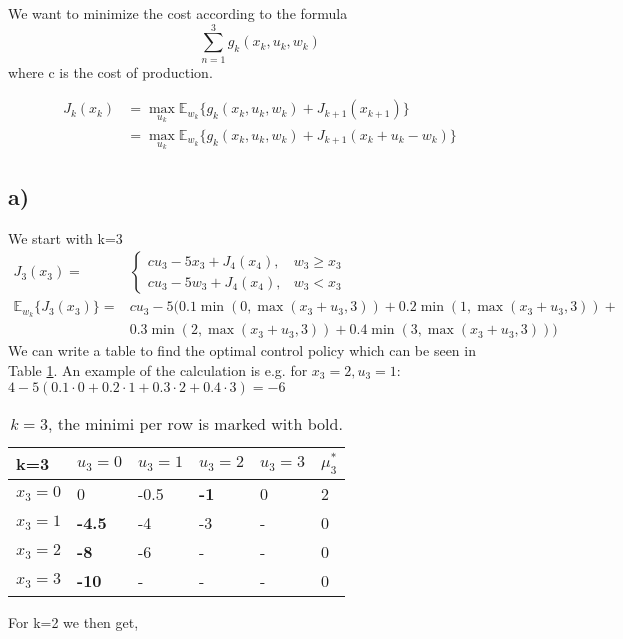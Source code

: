 \documentclass{article}
\begin{document}
We want to minimize the cost  according to the formula
\begin{equation}
	\sum_{n=1}^{3} g_k(x_k,u_k,w_k)
\end{equation}
where c is the cost of production.

\begin{align}
	J_k(x_k) &= \max_{u_k} \mathbb{E}_{w_k} \lbrace g_k(x_k,u_k,w_k) + J_{k+1}(x_{k+1}) \rbrace \\
	&= \max_{u_k} \mathbb{E}_{w_k} \lbrace g_k(x_k,u_k,w_k) + J_{k+1}(x_{k} + u_k - w_k) \rbrace
\end{align}
\subsection*{a)}
We start with k=3
\begin{align}
	J_3(x_3) =& 
	\begin{cases}
		c u_3 - 5x_3 + J_4(x_4), & w_3 \geq x_3\\
		c u_3 - 5w_3 + J_4(x_4), & w_3 < x_3
	\end{cases}\\
	\mathbb{E}_{w_k}\lbrace J_3(x_3)\rbrace =& cu_3 -5(0.1\min(0,\max(x_3+u_3,3)) + 0.2\min(1,\max(x_3+u_3,3)) +\\ &0.3\min(2,\max(x_3+u_3,3))+0.4\min(3,\max(x_3+u_3,3)))
\end{align}
We can write a table to find the optimal control policy which can be seen in Table \ref{tab:k3}. An example of the calculation is e.g. for $x_3 = 2, u_3 = 1$: $4-5(0.1\cdot0 + 0.2\cdot1 +0.3\cdot2+0.4\cdot3) = -6$
\begin{table}[h]
	\centering
	\caption{$k=3$, the minimi per row is marked with bold.}
	\label{tab:k3}
	\begin{tabular}{l|llll|l}
		k=3     & $u_3=0$       & $u_3=1$ & $u_3=2$     & $u_3=3$ & $\mu_3^*$ \\ \hline
		$x_3=0$ & 0             & -0.5    & \textbf{-1} & 0       & 2         \\
		$x_3=1$ & \textbf{-4.5} & -4      & -3          & -       & 0         \\
		$x_3=2$ & \textbf{-8}   & -6      & -           & -       & 0         \\
		$x_3=3$ & \textbf{-10}  & -       & -           & -       & 0        
	\end{tabular}
\end{table}

For k=2 we then get,
\end{document}
